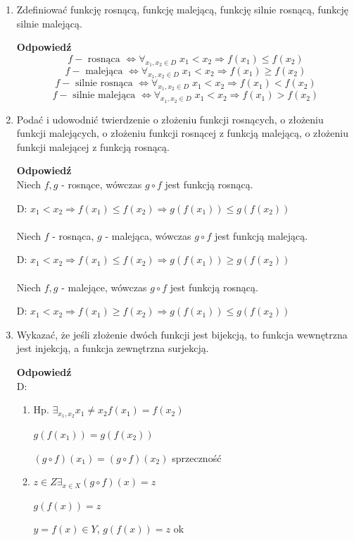 \documentclass[12pt,a4paper]{article}
\newcounter{twierdzenie}
\theoremstyle{break}
\newcommand{\Odp}[1]{
		\begin{mdframed}[style=zadanie]
			\textbf{Odpowiedź}\\
			#1
		\end{mdframed}
	}
\begin{document}
\begin{enumerate}[1.]
	\item Zdeﬁniować funkcję rosnącą, funkcję malejącą, funkcję silnie rosnącą, funkcję silnie malejącą.
	\Odp{
		$$f-\text{ rosnąca } \Leftrightarrow \forall_{x_1,x_2\in D}\; x_1<x_2\Rightarrow f(x_1)\leq f(x_2)$$
		$$f-\text{ malejąca } \Leftrightarrow \forall_{x_1,x_2\in D}\; x_1<x_2\Rightarrow f(x_1)\geq f(x_2)$$
		$$f-\text{ silnie rosnąca } \Leftrightarrow \forall_{x_1,x_2\in D}\; x_1<x_2\Rightarrow f(x_1)< f(x_2)$$
		$$f-\text{ silnie malejąca } \Leftrightarrow \forall_{x_1,x_2\in D}\; x_1<x_2\Rightarrow f(x_1)> f(x_2)$$
		
	}
	
	\item Podać i udowodnić twierdzenie o złożeniu funkcji rosnących, o złożeniu funkcji malejących, o złożeniu funkcji rosnącej z funkcją malejącą, o złożeniu funkcji malejącej z funkcją rosnącą.
	\Odp{
		Niech $f,g$ - rosnące, wówczas $g\circ f$ jest funkcją rosnącą.
		
		D: $x_1<x_2 \Rightarrow f(x_1)\leq f(x_2) \Rightarrow g(f(x_1))\leq g(f(x_2))$\\\\
		
		Niech $f$ - rosnąca, $g$ - malejąca, wówczas $g\circ f$ jest funkcją malejącą.
		
		D: $x_1<x_2 \Rightarrow f(x_1)\leq f(x_2) \Rightarrow g(f(x_1))\geq g(f(x_2))$\\\\
		
		Niech $f,g$ - malejące, wówczas $g\circ f$ jest funkcją rosnącą.
		
		D: $x_1<x_2 \Rightarrow f(x_1)\geq f(x_2) \Rightarrow g(f(x_1))\leq g(f(x_2))$
	}
	
	\item Wykazać, że jeśli złożenie dwóch funkcji jest bijekcją, to funkcja wewnętrzna jest	injekcją, a funkcja zewnętrzna surjekcją.
	\Odp{
		D: 
		\begin{enumerate}[(1)]
			\item Hp. $\exists_{x_1,x_2} x_1\neq x_2 f(x_1)=f(x_2)$
			
			$g(f(x_1))=g(f(x_2))$
			
			$(g\circ f)(x_1)=(g\circ f)(x_2)$ sprzeczność
			
			\item $z\in Z \exists_{x\in X} (g\circ f)(x)=z$
			
			$g(f(x))=z$
			
			$y=f(x)\in Y$, $g(f(x))=z$ ok 
		\end{enumerate}
	}
	

\end{enumerate}
\end{document}
